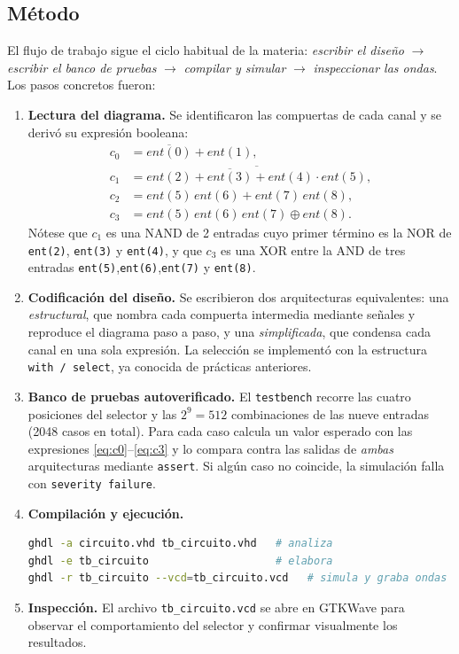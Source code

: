 \documentclass[12pt,a4paper]{article}
\begin{document}
\subsection*{Método}

El flujo de trabajo sigue el ciclo habitual de la materia: \emph{escribir el
diseño} $\rightarrow$ \emph{escribir el banco de pruebas} $\rightarrow$
\emph{compilar y simular} $\rightarrow$ \emph{inspeccionar las ondas}. Los pasos
concretos fueron:

\begin{enumerate}
    \item \textbf{Lectura del diagrama.} Se identificaron las compuertas de
          cada canal y se derivó su expresión booleana:
          \begin{align}
            c_0 &= \overline{ent(0)} + ent(1), \label{eq:c0}\\
            c_1 &= \overline{\overline{ent(2) + ent(3) + ent(4)} \cdot ent(5)}, \label{eq:c1}\\
            c_2 &= ent(5)\,ent(6) + ent(7)\,ent(8), \label{eq:c2}\\
            c_3 &= ent(5)\,ent(6)\,ent(7) \oplus ent(8). \label{eq:c3}
          \end{align}
          Nótese que $c_1$ es una NAND de 2 entradas cuyo primer término es la
          NOR de \texttt{ent(2)}, \texttt{ent(3)} y \texttt{ent(4)}, y que
          $c_3$ es una XOR entre la AND de tres entradas
          \texttt{ent(5)},\texttt{ent(6)},\texttt{ent(7)} y \texttt{ent(8)}.
    \item \textbf{Codificación del diseño.} Se escribieron dos arquitecturas
          equivalentes: una \emph{estructural}, que nombra cada compuerta
          intermedia mediante señales y reproduce el diagrama paso a paso, y
          una \emph{simplificada}, que condensa cada canal en una sola
          expresión. La selección se implementó con la estructura
          \texttt{with~/~select}, ya conocida de prácticas anteriores.
    \item \textbf{Banco de pruebas autoverificado.} El \texttt{testbench}
          recorre las cuatro posiciones del selector y las $2^9 = 512$
          combinaciones de las nueve entradas (2048 casos en total). Para cada
          caso calcula un valor esperado con las expresiones
          \eqref{eq:c0}--\eqref{eq:c3} y lo compara
          contra las salidas de \emph{ambas} arquitecturas mediante
          \texttt{assert}. Si algún caso no coincide, la simulación falla con
          \texttt{severity failure}.
    \item \textbf{Compilación y ejecución.}
\begin{lstlisting}[language=bash]
ghdl -a circuito.vhd tb_circuito.vhd   # analiza
ghdl -e tb_circuito                    # elabora
ghdl -r tb_circuito --vcd=tb_circuito.vcd   # simula y graba ondas
\end{lstlisting}
    \item \textbf{Inspección.} El archivo \texttt{tb\_circuito.vcd} se abre en
          GTKWave para observar el comportamiento del selector y confirmar
          visualmente los resultados.
\end{enumerate}
\end{document}
